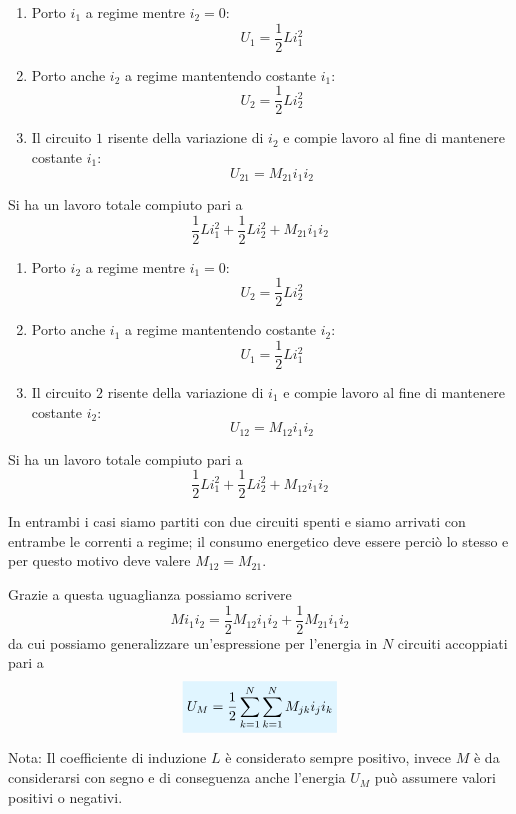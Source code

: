 \documentclass[x11names]{report}
\newcommand{\nota}[2]{
	\begin{attenzione}{Nota:}
		#2
	\end{attenzione}
}
\newcommand{\viola}[1]{%
	\colorbox{myblue}{$\displaystyle #1$}
}
\begin{document}
\vspace{0.5cm}
\hspace{-0.7cm}
\begin{minipage}{0.5\textwidth}
	\begin{enumerate}
		\item Porto \(i_1\) a regime mentre \(i_2 = 0\): 
		\[ U_1=\frac{1}{2}Li_1^2\]
		\item Porto anche \(i_2\) a regime mantentendo costante \(i_1\): \[U_2=\frac{1}{2}Li_2^2\]
		\item Il circuito \(1\) risente della variazione di \(i_2\) e compie lavoro al fine di mantenere costante \(i_1\):
		\[U_{21} = M_{21} i_1 i_2\]
	\end{enumerate}
	Si ha un lavoro totale compiuto pari a 
	\[
	\frac{1}{2}Li_1^2 + \frac{1}{2}Li_2^2 + M_{21} i_1 i_2
	\]
\end{minipage}
\begin{minipage}{0.5\textwidth}
	\begin{enumerate}
		\item Porto \(i_2\) a regime mentre \(i_1 = 0\): 
		\[ U_2=\frac{1}{2}Li_2^2\]
		\item Porto anche \(i_1\) a regime mantentendo costante \(i_2\): \[U_1=\frac{1}{2}Li_1^2\]
		\item Il circuito \(2\) risente della variazione di \(i_1\) e compie lavoro al fine di mantenere costante \(i_2\):
		\[U_{12} = M_{12} i_1 i_2\]
	\end{enumerate}
	Si ha un lavoro totale compiuto pari a 
	\[
	\frac{1}{2}Li_1^2 + \frac{1}{2}Li_2^2 + M_{12} i_1 i_2
	\]
\end{minipage}
\vspace{0.5cm}

\noindent
In entrambi i casi siamo partiti con due circuiti spenti e siamo arrivati con entrambe le correnti a regime; il consumo energetico deve essere perciò lo stesso e per questo motivo deve valere \(M_{12} = M_{21}\).

Grazie a questa uguaglianza possiamo scrivere
\[
Mi_1i_2 = \frac{1}{2}M_{12}i_1i_2 + \frac{1}{2}M_{21}i_1i_2 
\]
da cui possiamo generalizzare un'espressione per l'energia in \(N\) circuiti accoppiati pari a 
\begin{equation}
	\viola{U_M = \frac{1}{2}\sum_{k=1}^N\sum_{k=1}^N M_{jk}i_ji_k}
\end{equation}
\nota{}{Il coefficiente di induzione \(L\) è considerato sempre positivo, invece \(M\) è da considerarsi con segno e di conseguenza anche l'energia \(U_M\) può assumere valori positivi o negativi.}
\end{document}
